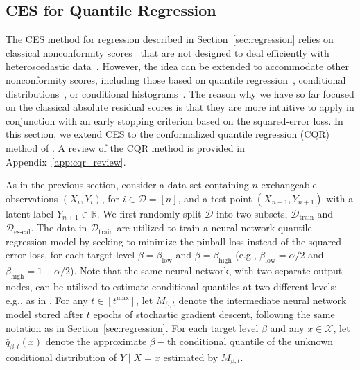 \subsection{CES for Quantile Regression} \label{sec:regression-cqr}

The CES method for regression described in Section~\ref{sec:regression} relies on classical nonconformity scores~\citep{vovk2005algorithmic,lei2016RegressionPS} that are not designed to deal efficiently with heteroscedastic data~\citep{romano2019conformalized,sesia2020comparison}.
However, the idea can be extended to accommodate other nonconformity scores, including those based on quantile regression~\citep{romano2019conformalized}, conditional distributions~\citep{izbicki2019flexible, chernozhukov2019distributional}, or conditional histograms~\citep{sesia2021conformal}.
The reason why we have so far focused on the classical absolute residual scores is that they are more intuitive to apply in conjunction with an early stopping criterion based on the squared-error loss. In this section, we extend CES to the conformalized quantile regression (CQR) method of \citet{romano2019conformalized}. A review of the CQR method is provided in Appendix~\ref{app:cqr_review}.

As in the previous section, consider a data set containing $n$ exchangeable observations $(X_i,Y_i)$, for $i \in \mathcal{D} = [n]$, and a test point $(X_{n+1}, Y_{n+1})$ with a latent label $Y_{n+1} \in \mathbb{R}$. 
We first randomly split $\mathcal{D}$ into two subsets, $\mathcal{D}_{\text{train}}$ and $\mathcal{D}_{\text{es-cal}}$. The data in $\mathcal{D}_{\text{train}}$ are utilized to train a neural network quantile regression model \cite{taylor2000quantile} by seeking to minimize the pinball loss instead of the squared error loss, for each target level $\beta=\beta_{\text{low}}$ and $\beta=\beta_{\text{high}}$ (e.g., $\beta_{\text{low}} = \alpha/2$ and $\beta_{\text{high}}=1-\alpha/2$). Note that the same neural network, with two separate output nodes, can be utilized to estimate conditional quantiles at two different levels; e.g., as in \citet{romano2019conformalized}.
For any $t \in [t^{\text{max}}]$, let $M_{\beta, t}$ denote the intermediate neural network model stored after $t$ epochs of stochastic gradient descent, following the same notation as in Section~\ref{sec:regression}.
For each target level $\beta$ and any $x \in \mathcal{X}$, let $\hat{q}_{\beta, t}(x)$ denote the approximate $\beta-$th conditional quantile of the unknown conditional distribution of $Y \mid X=x$ estimated by $M_{\beta, t}$.


